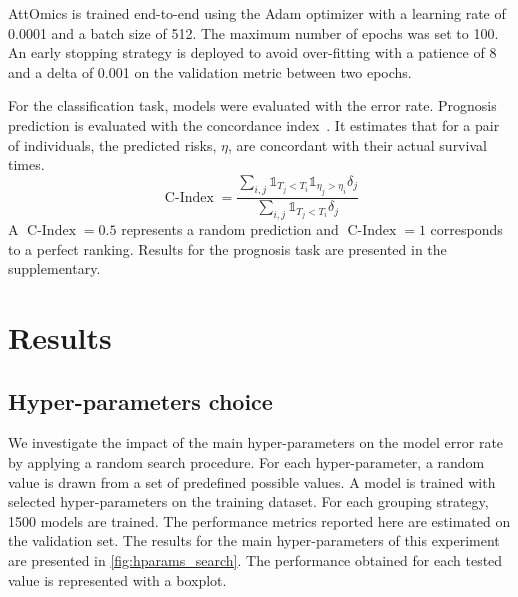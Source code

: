 \documentclass[../main.tex]{subfiles}
\begin{document}
AttOmics is trained end-to-end using the Adam optimizer with a learning rate of 0.0001 and a batch size of 512.
The maximum number of epochs was set to 100.
An early stopping strategy is deployed to avoid over-fitting with a patience of 8 and a delta of 0.001 on the validation metric between two epochs.

For the classification task, models were evaluated with the error rate.
Prognosis prediction is evaluated with the concordance index~\cite{harrellMultivariablePrognosticModels1996}.
It estimates that for a pair of individuals, the predicted risks, $\eta$,  are concordant with their actual survival times.
\[ \operatorname{C-Index} = \frac{\sum_{i,j}\mathbb{1}_{T_j < T_i}\mathbb{1}_{\eta_j > \eta_i}\delta_j}{\sum_{i,j}\mathbb{1}_{T_j < T_i}\delta_j} \]
A $\operatorname{C-Index} = 0.5$ represents a random prediction and $\operatorname{C-Index} = 1$ corresponds to a perfect ranking.
Results for the prognosis task are presented in the supplementary.

\section{Results}

\subsection{Hyper-parameters choice}

We investigate the impact of the main hyper-parameters on the model error rate by applying a random search procedure.
For each hyper-parameter, a random value is drawn from a set of predefined possible values.
A model is trained with selected hyper-parameters on the training dataset.
For each grouping strategy, 1500 models are trained.
The performance metrics reported here are estimated on the validation set.
The results for the main hyper-parameters of this experiment are presented in \cref{fig:hparams_search}.
The performance obtained for each tested value is represented with a boxplot.
\end{document}
